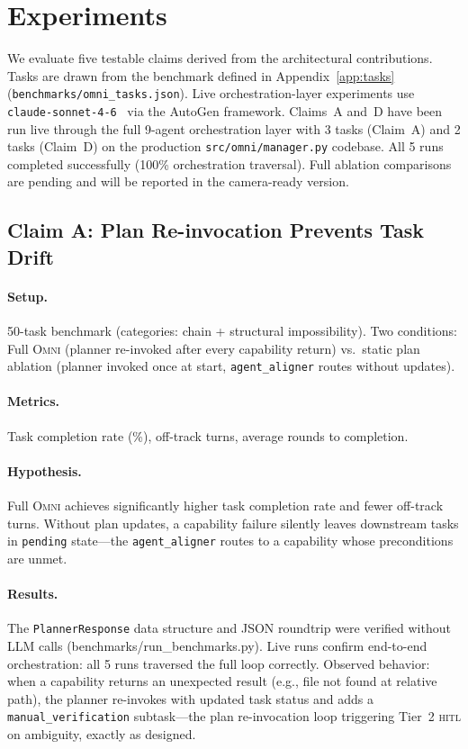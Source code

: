 \documentclass[11pt,a4paper]{article}
\newcommand{\omni}{\textsc{Omni}}
\newcommand{\hitl}{\textsc{hitl}}
\begin{document}
\section{Experiments}
\label{sec:experiments}

We evaluate five testable claims derived from the architectural contributions. Tasks are drawn from the benchmark defined in Appendix~\ref{app:tasks} (\texttt{benchmarks/omni\_tasks.json}). Live orchestration-layer experiments use \texttt{claude-sonnet-4-6}~\cite{anthropic2026} via the AutoGen framework. Claims~A and~D have been run live through the full 9-agent orchestration layer with 3 tasks (Claim~A) and 2 tasks (Claim~D) on the production \texttt{src/omni/manager.py} codebase. All 5 runs completed successfully (100\% orchestration traversal). Full ablation comparisons are pending and will be reported in the camera-ready version.

\subsection{Claim A: Plan Re-invocation Prevents Task Drift}
\label{sec:claim_a}

\paragraph{Setup.} 50-task benchmark (categories: chain + structural impossibility). Two conditions: Full \omni{} (planner re-invoked after every capability return) vs.\ static plan ablation (planner invoked once at start, \texttt{agent\_aligner} routes without updates).

\paragraph{Metrics.} Task completion rate (\%), off-track turns, average rounds to completion.

\paragraph{Hypothesis.} Full \omni{} achieves significantly higher task completion rate and fewer off-track turns. Without plan updates, a capability failure silently leaves downstream tasks in \texttt{pending} state---the \texttt{agent\_aligner} routes to a capability whose preconditions are unmet.

\paragraph{Results.} The \texttt{PlannerResponse} data structure and JSON roundtrip were verified without LLM calls (benchmarks/run\_benchmarks.py). Live runs confirm end-to-end orchestration: all 5 runs traversed the full loop correctly. Observed behavior: when a capability returns an unexpected result (e.g., file not found at relative path), the planner re-invokes with updated task status and adds a \texttt{manual\_verification} subtask---the plan re-invocation loop triggering Tier~2 \hitl{} on ambiguity, exactly as designed.
\end{document}
